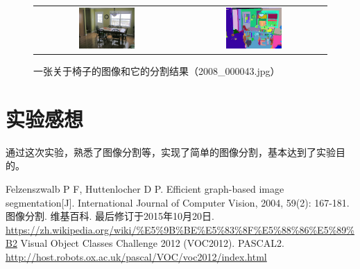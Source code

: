 \documentclass[a4paper, 12pt, UTF8]{article}
\begin{document}
\begin{figure}[h!]
    \centering
    \begin{tabular}{cc}
        \includegraphics[width=0.4\textwidth]{src/images/2008_000043.jpg} &
        \includegraphics[width=0.4\textwidth]{src/images/2008_000043_output.jpg}
    \end{tabular}
    \caption{一张关于椅子的图像和它的分割结果（2008\_000043.jpg）}
    \label{figure_chair}
\end{figure}

\section{实验感想}

通过这次实验，熟悉了图像分割等，实现了简单的图像分割，基本达到了实验目的。


\renewcommand{\refname}{参考}
\begin{thebibliography}{9}
 Felzenszwalb P F, Huttenlocher D P. Efficient graph-based image segmentation[J]. International Journal of Computer Vision, 2004, 59(2): 167-181.
 图像分割. 维基百科. 最后修订于2015年10月20日. \url{https://zh.wikipedia.org/wiki/%E5%9B%BE%E5%83%8F%E5%88%86%E5%89%B2}
 Visual Object Classes Challenge 2012 (VOC2012).  PASCAL2. \url{http://host.robots.ox.ac.uk/pascal/VOC/voc2012/index.html}
\end{thebibliography}
\end{document}
